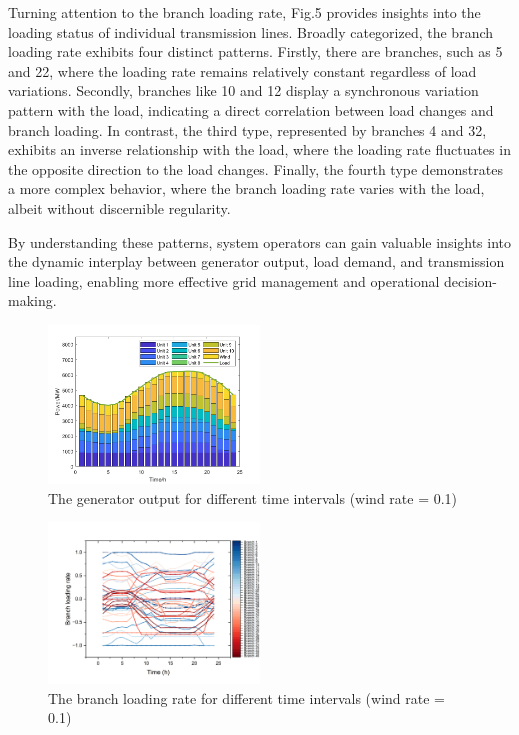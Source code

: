 \documentclass[lettersize,journal]{IEEEtran}
\begin{document}
Turning attention to the branch loading rate, Fig.5 provides insights into the loading status of individual transmission lines. Broadly categorized, the branch loading rate exhibits four distinct patterns. Firstly, there are branches, such as 5 and 22, where the loading rate remains relatively constant regardless of load variations. Secondly, branches like 10 and 12 display a synchronous variation pattern with the load, indicating a direct correlation between load changes and branch loading. In contrast, the third type, represented by branches 4 and 32, exhibits an inverse relationship with the load, where the loading rate fluctuates in the opposite direction to the load changes. Finally, the fourth type demonstrates a more complex behavior, where the branch loading rate varies with the load, albeit without discernible regularity.

By understanding these patterns, system operators can gain valuable insights into the dynamic interplay between generator output, load demand, and transmission line loading, enabling more effective grid management and operational decision-making.

\begin{figure}
	\centering
	\includegraphics[width=0.5\textwidth]{t2-windrate0.1}
	\caption{The generator output for different time intervals (wind rate = 0.1)}
	\label{fig_4}
\end{figure}

\begin{figure}
	\centering
	\includegraphics[width=0.5\textwidth]{t2-br-wr0.1}
	\caption{The branch loading rate for different time intervals (wind rate = 0.1)}
	\label{fig_2}
\end{figure}
\end{document}
